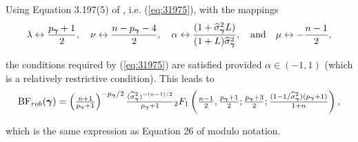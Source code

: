 \noindent 
Using Equation 3.197(5) of \cite{Gradshteyn2007}, i.e. (\ref{eq:31975}), 
with the mappings
$$
\lambda \leftrightarrow \frac{p_{\boldsymbol \gamma}+1}{2},
\quad 
\nu \leftrightarrow \frac{n - p_{\boldsymbol \gamma} - 4}{2},
\quad 
\alpha \leftrightarrow \frac{(1 + \widehat{\sigma}_{\boldsymbol \gamma}^2 L)}{(1 + L)\widehat{\sigma}_{\boldsymbol \gamma}^2},
\quad \mbox{and} \quad 
\mu \leftrightarrow -\frac{n-1}{2},
$$

\noindent the conditions required by (\ref{eq:31975}) are satisfied
provided $\alpha \in (-1,1)$ (which is a relatively restrictive condition). 
%
%
This leads to
\begin{equation}\label{eq:yGivenGammaRobust}
	\displaystyle \mbox{BF}_{{rob}}({\boldsymbol \gamma})
	= \left( \tfrac{n + 1}{ p_{\boldsymbol \gamma} + 1} \right)^{ - p_{\boldsymbol \gamma}/2} \tfrac{(\widehat{\sigma}_{\boldsymbol \gamma}^2)^{-(n-1)/2}}{p_{\boldsymbol \gamma}+1}
	{}_2F_1\left( \tfrac{n-1}{2}, \tfrac{p_{\boldsymbol \gamma}+1}{2}; \tfrac{p_{\boldsymbol \gamma}+3}{2}  ; 
	\tfrac{(1  - 1/\widehat{\sigma}_{\boldsymbol \gamma}^2)(p_{\boldsymbol \gamma} + 1)}{1 + n}  \right),
\end{equation}


\noindent 
which is the same expression as Equation 26 of \cite{Bayarri2012}
modulo notation.

